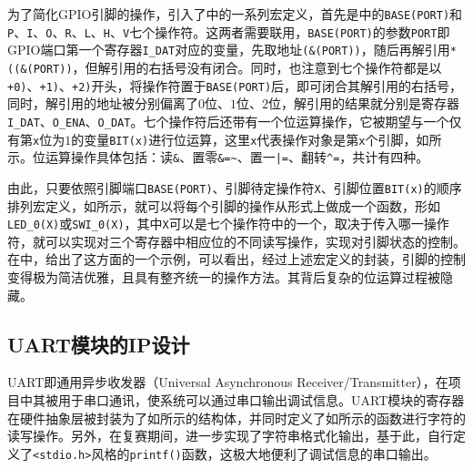 为了简化GPIO引脚的操作，引入了中的一系列宏定义，首先是中的\texttt{BASE(PORT)}和\texttt{P}、\texttt{I}、\texttt{O}、\texttt{R}、\texttt{L}、\texttt{H}、\texttt{V}七个操作符。这两者需要联用，\texttt{BASE(PORT)}的参数\texttt{PORT}即GPIO端口第一个寄存器\texttt{I\_DAT}对应的变量，先取地址\texttt{(\&(PORT))}，随后再解引用\texttt{*((\&(PORT))}，但解引用的右括号没有闭合。同时，也注意到七个操作符都是以\texttt{+0)}、\texttt{+1)}、\texttt{+2)}开头，将操作符置于\texttt{BASE(PORT)}后，即可闭合其解引用的右括号，同时，解引用的地址被分别偏离了$0$位、$1$位、$2$位，解引用的结果就分别是寄存器\texttt{I\_DAT}、\texttt{O\_ENA}、\texttt{O\_DAT}。七个操作符后还带有一个位运算操作，它被期望与一个仅有第\texttt{x}位为$1$的变量\texttt{BIT(x)}进行位运算，这里\texttt{x}代表操作对象是第\texttt{x}个引脚，如所示。位运算操作具体包括：读\texttt{\&}、置零\texttt{\&=\~{}}、置一\texttt{|=}、翻转\texttt{\^{}=}，共计有四种。





由此，只要依照引脚端口\texttt{BASE(PORT)}、引脚待定操作符\texttt{X}、引脚位置\texttt{BIT(x)}的顺序排列宏定义，如所示，就可以将每个引脚的操作从形式上做成一个函数，形如\texttt{LED\_0(X)}或\texttt{SWI\_0(X)}，其中\texttt{X}可以是七个操作符中的一个，取决于传入哪一操作符，就可以实现对三个寄存器中相应位的不同读写操作，实现对引脚状态的控制。在中，给出了这方面的一个示例，可以看出，经过上述宏定义的封装，引脚的控制变得极为简洁优雅，且具有整齐统一的操作方法。其背后复杂的位运算过程被隐藏。



\subsection{UART模块的IP设计}
UART即通用异步收发器（Universal Asynchronous Receiver/Transmitter），在项目中其被用于串口通讯，使系统可以通过串口输出调试信息。UART模块的寄存器在硬件抽象层被封装为了如所示的结构体，并同时定义了如所示的函数进行字符的读写操作。另外，在复赛期间，进一步实现了字符串格式化输出，基于此，自行定义了\texttt{<stdio.h>}风格的\texttt{printf()}函数，这极大地便利了调试信息的串口输出。

